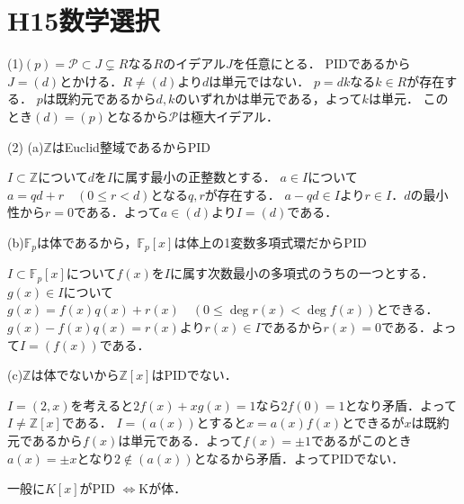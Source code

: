 \documentclass[
		book,
		head_space=20mm,
		foot_space=20mm,
		gutter=10mm,
		line_length=190mm
]{jlreq}
\begin{document}
\section{H15数学選択}
(1)$(p)=\mathcal{P}\subset J\subsetneq R$なる$R$のイデアル$J$を任意にとる．
PIDであるから$J=(d)$とかける．$R\neq (d)$より$d$は単元ではない．
$p=dk$なる$k\in R$が存在する．
$p$は既約元であるから$d,k$のいずれかは単元である，よって$k$は単元．
このとき$(d)=(p)$となるから$\mathcal{P}$は極大イデアル．

(2)
(a)$\mathbb{Z}$はEuclid整域であるからPID
\begin{tcolorbox}[blanker,breakable,
	left=3mm,right=3mm,
	top=3mm,bottom=3mm,
	before skip=15pt,after skip=15pt,
	borderline vertical={1pt}{0pt}{black,dotted}]
	$I\subset \mathbb{Z}$について$d$を$I$に属す最小の正整数とする．
    $a \in I$について$a=qd+r\quad(0\le r<d)$となる$q,r$が存在する．
    $a-qd\in I$より$r\in I$．$d$の最小性から$r=0$である．よって$a \in (d)$より$I=(d)$である．
	\end{tcolorbox}

(b)$\mathbb{F}_p$は体であるから，$\mathbb{F}_p[x]$は体上の1変数多項式環だからPID
\begin{tcolorbox}[blanker,breakable,
	left=3mm,right=3mm,
	top=3mm,bottom=3mm,
	before skip=15pt,after skip=15pt,
	borderline vertical={1pt}{0pt}{black,dotted}]
	$I\subset \mathbb{F}_p[x]$について$f(x)$を$I$に属す次数最小の多項式のうちの一つとする．$g(x)\in I$について$g(x)=f(x)q(x)+r(x)\quad(0\le \deg r(x)<\deg f(x))$とできる．
    $g(x)-f(x)q(x)=r(x)$より$r(x)\in I$であるから$r(x)=0$である．よって$I=(f(x))$である．
	\end{tcolorbox}

(c)$\mathbb{Z}$は体でないから$\mathbb{Z}[x]$はPIDでない．
\begin{tcolorbox}[blanker,breakable,
	left=3mm,right=3mm,
	top=3mm,bottom=3mm,
	before skip=15pt,after skip=15pt,
	borderline vertical={1pt}{0pt}{black,dotted}]
	$I=(2,x)$を考えると$2f(x)+xg(x)=1$なら$2f(0)=1$となり矛盾．よって$I\neq \mathbb{Z}[x]$である．
    $I=(a(x))$とすると$x=a(x)f(x)$とできるが$x$は既約元であるから$f(x)$は単元である．よって$f(x)=\pm{1}$であるがこのとき$a(x)=\pm{x}$となり$2\notin (a(x))$となるから矛盾．よってPIDでない．

    一般に$K[x]$がPID $\Leftrightarrow$Kが体．
	\end{tcolorbox}
\end{document}
